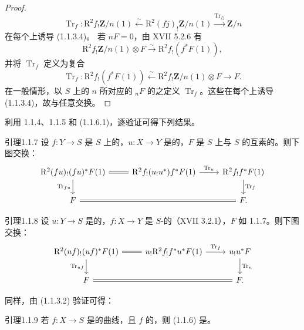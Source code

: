 \begin{proof}
\[\operatorname{Tr}_f:\mathrm R^2f_!\mathbf Z/n(1)\xleftarrow\sim\mathrm R^2(fj)_!\mathbf Z/n(1)\xrightarrow{\operatorname{Tr}_{fj}}\mathbf Z/n\]
在每个上诱导 (1.1.3.4)。
若 $nF=0$，由 XVII 5.2.6 有
\begin{equation}\mathrm R^2f_!\mathbf Z/n(1)\otimes F\xrightarrow\sim\mathrm R^2f_!(f^*F(1)),\tag{1.1.6.1}\end{equation}
并将 $\operatorname{Tr}_f$ 定义为复合
\[\operatorname{Tr}_f:\mathrm R^2f_!(f^*F(1))\xleftarrow\sim\mathrm R^2f_!\mathbf Z/n(1)\otimes F\longrightarrow F.\]
在一般情形，以 $S$ 上的 $n$ 所对应的 ${}_nF$ 的之定义 $\operatorname{Tr}_f$。这些在每个上诱导 (1.1.3.4)，故与任意交换。
\end{proof}
利用 1.1.4、1.1.5 和 (1.1.6.1)，逐验证可得下列结果。
\begin{SGAresult}{引理}{1.1.7}
设 $f:Y\to S$ 是 $S$ 上的，$u:X\to Y$ 是的，$F$ 是 $S$ 上与 $S$ 的互素的。则下图交换：
\[\begin{tikzcd}\mathrm R^2(fu)_!(fu)^*F(1)\ar[r,equal]\ar[d,"\operatorname{Tr}_{fu}"']&\mathrm R^2f_!(u_!u^*)f^*F(1)\ar[r,"\operatorname{Tr}_u"]&\mathrm R^2f_!f^*F(1)\ar[d,"\operatorname{Tr}_f"]\\F\ar[rr,equal]&&F.\end{tikzcd}\]
\end{SGAresult}
\begin{SGAresult}{引理}{1.1.8}
设 $u:Y\to S$ 是的，$f:X\to Y$ 是 $S$-的（XVII 3.2.1），$F$ 如 1.1.7。则下图交换：
\[\begin{tikzcd}\mathrm R^2(uf)_!(uf)^*F(1)\ar[r,equal]\ar[d,"\operatorname{Tr}_{uf}"']&u_!\mathrm R^2f_!f^*u^*F(1)\ar[r,"\operatorname{Tr}_f"]&u_!u^*F\ar[d,"\operatorname{Tr}_u"]\\F\ar[rr,equal]&&F.\end{tikzcd}\]
\end{SGAresult}
同样，由 (1.1.3.2) 验证可得：
\begin{SGAresult}{引理}{1.1.9}
若 $f:X\to S$ 是的曲线，且 $f$ 的，则 (1.1.6) 是。
\end{SGAresult}
